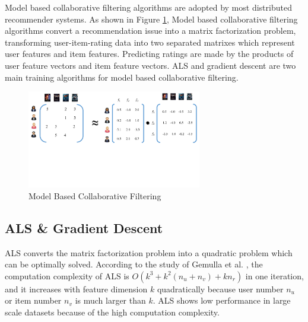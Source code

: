 \documentclass{llncs}
\begin{document}
\label{sec:background}

Model based collaborative filtering algorithms are adopted by most distributed recommender systems. As shown in Figure \ref{fig:MF}, Model based collaborative filtering algorithms convert a recommendation issue into a matrix factorization problem, transforming user-item-rating data into two separated matrixes which represent user features and item features. Predicting ratings are made by the products of user feature vectors and item feature vectors.
ALS and gradient descent are two main training algorithms for model based collaborative filtering.
\vspace{-5pt}

\begin{figure}[!htb]
\centering
\includegraphics[width=3in]{pics/MFIntroduction.pdf}
\vspace{-60pt}
\caption{Model Based Collaborative Filtering}
\vspace{-15pt}
\label{fig:MF}
\end{figure}

\subsection{ALS \& Gradient Descent}
\label{sub:gd}

ALS \cite{ALS} converts the matrix factorization problem into a quadratic problem which can be optimally solved. According to the study of Gemulla et al. \cite{ibm2011}, the computation complexity of ALS is $O(k^3 + k^2(n_u + n_v) + kn_r)$ in one iteration, and it increases with feature dimension $k$ quadratically because user number $n_u$ or item number $n_v$ is much larger than $k$. ALS shows low performance in large scale datasets because of the high computation complexity.
\end{document}
